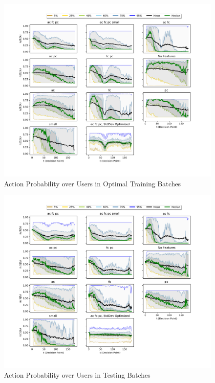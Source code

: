 	\begin{figure}[H]
	\includegraphics[width=1.5\textwidth,center]{figures/QM3train.png}%
	\caption{Action Probability over Users in Optimal Training Batches}
	\label{QM3train}
	\end{figure}

	\begin{figure}[H]
	\includegraphics[width=1.5\textwidth,center]{figures/QM3test.png}%
	\caption{Action Probability over Users in Testing Batches}
	\label{QM3test}
	\end{figure}

